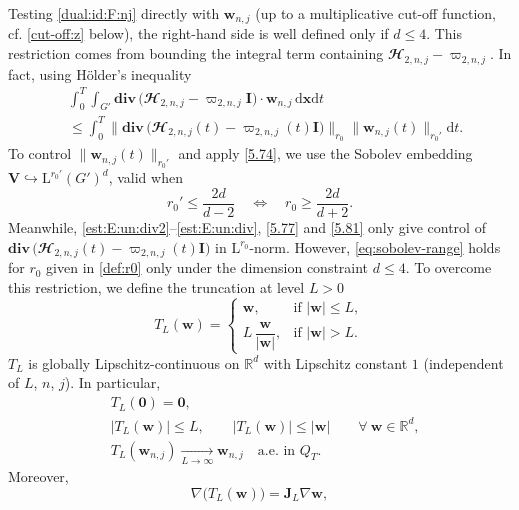 \documentclass[12pt,reqno]{amsart}
\numberwithin{equation}{section}
\theoremstyle{definition}
\def\d{\mathrm{d}}
\def\dxt{\,\mathrm{d}\boldsymbol{x}\mathrm{d}t}
\def\divv{\mathbf{div}\,}
\def\L{\mathrm{L}}
\def\w{\boldsymbol{w}}
\def\00{\boldsymbol{0}}
\def\bfI{\mathbf{I}}
\def\bcH{\mathbfcal{H}}
\begin{document}
{{{Testing \eqref{dual:id:F:nj} directly with $\w_{n,j}$ (up to a multiplicative cut-off function, cf. \eqref{cut-off:z} below), the right-hand side is well defined only if $d\leq 4$.
This restriction comes from bounding the integral term containing $\bcH_{2,n,j}-\varpi_{2,n,j}$.
In fact, using H\"older's inequality
\begin{equation}\label{RE1}
\begin{split}
&	\!\int_{0}^{T}\!\!\!\!\int_{G'} \divv\!\big(\bcH_{2,n,j}-\varpi_{2,n,j}\bfI \big)\cdot \w_{n,j}\dxt\\
&  \leq
 \int_{0}^T \big\|\divv \big(\bcH_{2,n,j}(t)-\varpi_{2,n,j}(t)\bfI\big)\big\|_{r_0}\|\w_{n,j}(t)\|_{r_0'} \d t.
\end{split}
\end{equation}
To control $\|\w_{n,j}(t)\|_{r_0'}$ and apply \eqref{5.74}, we use the Sobolev embedding $\mathbf{V} \hookrightarrow \L^{r_0'}(G')^d$, valid when
\begin{equation}\label{eq:sobolev-range}
r_0' \leq \frac{2d}{d-2} \quad\Leftrightarrow\quad r_0 \geq \frac{2d}{d+2}.
\end{equation}
Meanwhile, \eqref{est:E:un:div2}--\eqref{est:E:un:div}, \eqref{5.77} and \eqref{5.81}
only give control of $\divv \big(\bcH_{2,n,j}(t)-\varpi_{2,n,j}(t)\bfI\big)$ in $\L^{r_0}$-norm.
However, \eqref{eq:sobolev-range} holds for $r_0$ given in \eqref{def:r0} only under the dimension constraint $d \leq 4$.
To overcome this  restriction, we define the truncation at level $L>0$
\begin{equation}\label{eq:truncation-def}
T_L(\w)=
\begin{cases}
\w, & \text{if } |\w| \leq L, \\[2ex]
L\,\dfrac{\w}{|\w|}, & \text{if } |\w| > L.
\end{cases}
\end{equation}
$T_L$ is globally Lipschitz-continuous on $\mathbb R^{d}$ with Lipschitz constant $1$ (independent of $L$, $n$, $j$).
In particular,
\begin{align}
  & T_L(\00)=\00, \nonumber \\
  & |T_L(\w)| \leq L,\qquad |T_L(\w)|\leq |\w|\qquad \forall\ \w\in\mathbb{R}^d, \label{L:inf:bnd:tr} \\
  & T_L(\w_{n,j}) \xrightarrow[L\to\infty]{} \w_{n,j}\quad \text{a.e.\  in\ $Q_T$.} \nonumber
\end{align}
Moreover,
\begin{equation}\label{nabla:TL}
\nabla\big(T_L(\w)\big)=\mathbf{J}_L\nabla\w,
\end{equation}
}}}
\end{document}
